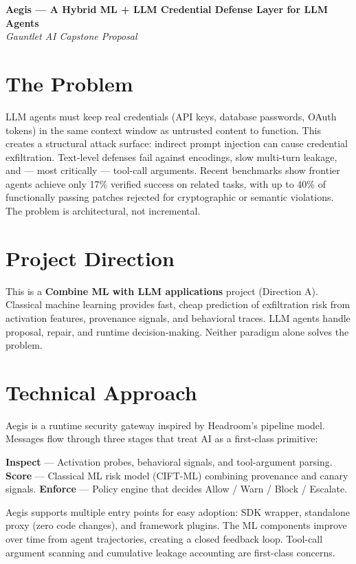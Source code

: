 \documentclass[11pt,letterpaper]{article}
\begin{document}
\begin{center}
\Large\textbf{Aegis — A Hybrid ML + LLM Credential Defense Layer for LLM Agents}\\[0.3em]
\normalsize\textit{Gauntlet AI Capstone Proposal}
\end{center}

\section*{The Problem}

LLM agents must keep real credentials (API keys, database passwords, OAuth tokens) in the same context window as untrusted content to function. This creates a structural attack surface: indirect prompt injection can cause credential exfiltration. Text-level defenses fail against encodings, slow multi-turn leakage, and — most critically — tool-call arguments. Recent benchmarks show frontier agents achieve only 17\% verified success on related tasks, with up to 40\% of functionally passing patches rejected for cryptographic or semantic violations. The problem is architectural, not incremental.

\section*{Project Direction}

This is a \textbf{Combine ML with LLM applications} project (Direction A). Classical machine learning provides fast, cheap prediction of exfiltration risk from activation features, provenance signals, and behavioral traces. LLM agents handle proposal, repair, and runtime decision-making. Neither paradigm alone solves the problem.

\section*{Technical Approach}

Aegis is a runtime security gateway inspired by Headroom's pipeline model. Messages flow through three stages that treat AI as a first-class primitive:

\textbf{Inspect} — Activation probes, behavioral signals, and tool-argument parsing.  
\textbf{Score} — Classical ML risk model (CIFT-ML) combining provenance and canary signals.  
\textbf{Enforce} — Policy engine that decides Allow / Warn / Block / Escalate.

Aegis supports multiple entry points for easy adoption: SDK wrapper, standalone proxy (zero code changes), and framework plugins. The ML components improve over time from agent trajectories, creating a closed feedback loop. Tool-call argument scanning and cumulative leakage accounting are first-class concerns.
\end{document}
